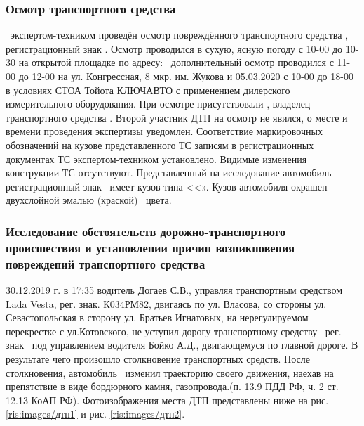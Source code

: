 	\subsubsection{Осмотр транспортного средства}
	
   \osm\, экспертом-техником проведён осмотр повреждённого транспортного средства \tc, регистрационный знак \grz. Осмотр проводился в сухую, ясную погоду с 10-00  до 10-30 на открытой площадке   по адресу: \, дополнительный осмотр проводился с 11-00 до 12-00 на ул. Конгрессная, 8 мкр. им. Жукова и 05.03.2020 с 10-00 до 18-00  в условиях СТОА Тойота КЛЮЧАВТО с применением дилерского измерительного оборудования.  При осмотре присутствовали , владелец транспортного средства . Второй участник ДТП на осмотр не явился, о месте и времени проведения экспертизы уведомлен. Соответствие маркировочных обозначений на кузове представленного ТС записям в регистрационных документах ТС экспертом-техником установлено. Видимые изменения конструкции ТС отсутствуют. Представленный на исследование автомобиль \, регистрационный знак \, имеет кузов типа <<». Кузов автомобиля окрашен двухслойной   %
   эмалью (краской)  \colr \, цвета.
   
                       
\subsubsection{Исследование обстоятельств дорожно-транспортного происшествия и установлении причин возникновения повреждений транспортного средства}
          
    30.12.2019 г. в 17:35 водитель Догаев С.В., управляя транспортным средством Lada Vesta, рег. знак. К034РМ82, двигаясь по ул. Власова, со стороны ул. Севастопольская в сторону ул. Братьев Игнатовых, на нерегулируемом перекрестке с ул.Котовского, не уступил дорогу транспортному средству \, рег. знак \, под управлением водителя Бойко А.Д., двигающемуся по главной дороге. В результате чего произошло столкновение транспортных средств. После столкновения, автомобиль \, изменил траекторию своего движения, наехав на препятствие в виде бордюрного камня, газопровода.(п. 13.9 ПДД РФ, ч. 2 ст. 12.13 КоАП РФ). Фотоизображения места ДТП представлены ниже на рис. \ref{ris:images/дтп1} и рис. \ref{ris:images/дтп2}.
    
